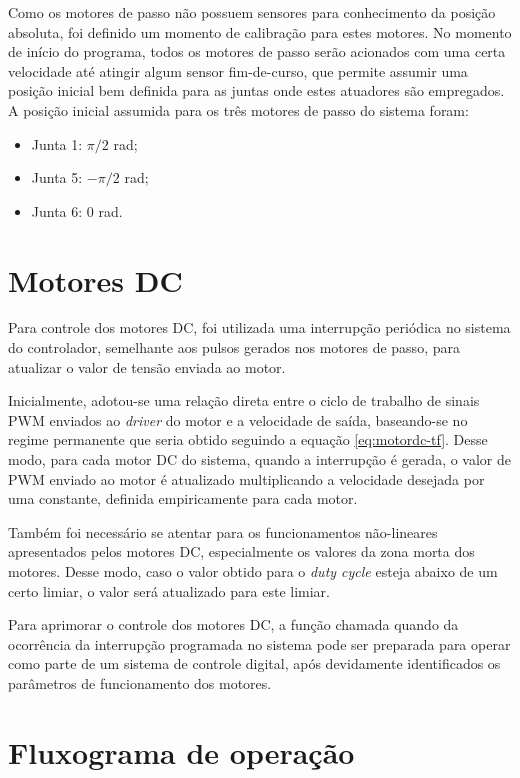 Como os motores de passo não possuem sensores para conhecimento da posição absoluta,
foi definido um momento de calibração para estes motores. No momento de início do programa, 
todos os motores de passo serão acionados com uma certa velocidade até atingir algum sensor 
fim-de-curso, que permite assumir uma posição inicial bem definida para as juntas onde estes
atuadores são empregados. A posição inicial assumida para os três motores de passo do sistema
foram: 

\begin{itemize}
    \item Junta 1: $\pi/2$ rad;
    \item Junta 5: $-\pi/2$ rad;
    \item Junta 6: $0$ rad.
\end{itemize}

\section{Motores DC}

Para controle dos motores DC, foi utilizada uma interrupção periódica no sistema do controlador,
semelhante aos pulsos gerados nos motores de passo, para atualizar o valor de tensão enviada
ao motor. 

Inicialmente, adotou-se uma relação direta entre o ciclo de trabalho de sinais PWM enviados 
ao \textit{driver} do motor e a velocidade de saída, baseando-se no regime permanente 
que seria obtido seguindo a equação \ref{eq:motordc-tf}. Desse modo, para cada motor
DC do sistema, quando a interrupção é gerada, o valor de PWM enviado ao motor é atualizado
multiplicando a velocidade desejada por uma constante, definida empiricamente para cada motor.

Também foi necessário se atentar para os funcionamentos não-lineares apresentados pelos motores
DC, especialmente os valores da zona morta dos motores. Desse modo, caso o valor obtido para
o \textit{duty cycle} esteja abaixo de um certo limiar, o valor será atualizado para este limiar.

Para aprimorar o controle dos motores DC, a função chamada quando da ocorrência da 
interrupção programada no sistema pode ser preparada para operar como parte de um sistema
de controle digital, após devidamente identificados os parâmetros de funcionamento dos
motores.

\section{Fluxograma de operação}


